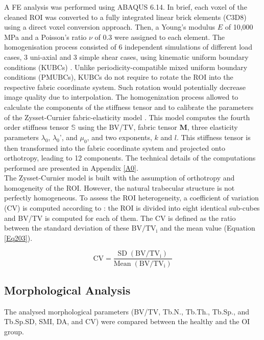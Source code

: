 \documentclass[a4paper,fleqn]{DC_ArtStyle}
\begin{document}
	A \si{\micro}FE analysis was performed using \textsc{ABAQUS 6.14}. In brief, each voxel of the cleaned ROI was converted to a fully integrated linear brick elements (C3D8) using a direct voxel conversion approach. Then, a Young's modulus $E$ of 10,000 MPa and a Poisson's ratio $\nu$ of 0.3 were assigned to each element. The homogenisation process consisted of 6 independent simulations of different load cases, 3 uni-axial and 3 simple shear cases, using kinematic uniform boundary conditions (KUBCs) \cite{Panyasantisuk2015}. Unlike periodicity-compatible mixed uniform boundary conditions (PMUBCs), KUBCs do not require to rotate the ROI into the respective fabric coordinate system. Such rotation would potentially decrease image quality due to interpolation. The homogenization process allowed to calculate the components of the stiffness tensor and to calibrate the parameters of the Zysset-Curnier fabric-elasticity model \cite{Zysset1995}. This model computes the fourth order stiffness tensor $\mathbb{S}$ using the BV/TV, fabric tensor $\mathbf{M}$, three elasticity parameters $\lambda_0$, $\lambda_0$', and $\mu_0$, and two exponents, $k$ and $l$. This stiffness tensor is then transformed into the fabric coordinate system and projected onto orthotropy, leading to 12 components. The technical details of the computations performed are presented in Appendix \ref{A0}.\\
	
	The Zysset-Curnier model is built with the assumption of orthotropy and homogeneity of the ROI. However, the natural trabecular structure is not perfectly homogeneous. To assess the ROI heterogeneity, a coefficient of variation (CV) is computed according to \citeauthor{Panyasantisuk2015}\cite{Panyasantisuk2015}: the ROI is divided into eight identical sub-cubes and BV/TV is computed for each of them. The CV is defined as the ratio between the standard deviation of these $\mathrm{BV/TV_i}$ and the mean value (Equation \ref{Eq203}).
	
	\begin{equation}
	\mathrm{CV} = \frac{\mathrm{SD\;(BV/TV_i)}}{\mathrm{Mean\;(BV/TV_i)}}
	\label{Eq203}
	\end{equation}
	
	\subsection{Morphological Analysis}
	The analysed morphological parameters (BV/TV, Tb.N., Tb.Th., Tb.Sp., and Tb.Sp.SD, SMI, DA, and CV) were compared between the healthy and the OI group.
	
\end{document}
